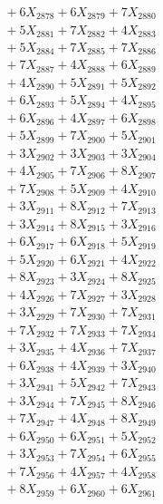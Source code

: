 \documentclass[a4paper,10pt]{article}
\begin{document}
{\begin{align}
&\;  + 6 X_{2878} + 6 X_{2879} + 7 X_{2880} \\[0.3ex]
&\;  + 5 X_{2881} + 7 X_{2882} + 4 X_{2883} \\[0.3ex]
&\;  + 5 X_{2884} + 7 X_{2885} + 7 X_{2886} \\[0.3ex]
&\;  + 7 X_{2887} + 4 X_{2888} + 6 X_{2889} \\[0.5ex]\allowbreak
&\;  + 4 X_{2890} + 5 X_{2891} + 5 X_{2892} \\[0.3ex]
&\;  + 6 X_{2893} + 5 X_{2894} + 4 X_{2895} \\[0.3ex]
&\;  + 6 X_{2896} + 4 X_{2897} + 6 X_{2898} \\[0.3ex]
&\;  + 5 X_{2899} + 7 X_{2900} + 5 X_{2901} \\[0.3ex]
&\;  + 3 X_{2902} + 3 X_{2903} + 3 X_{2904} \\[0.3ex]
&\;  + 4 X_{2905} + 7 X_{2906} + 8 X_{2907} \\[0.3ex]
&\;  + 7 X_{2908} + 5 X_{2909} + 4 X_{2910} \\[0.3ex]
&\;  + 3 X_{2911} + 8 X_{2912} + 7 X_{2913} \\[0.3ex]
&\;  + 3 X_{2914} + 8 X_{2915} + 3 X_{2916} \\[0.3ex]
&\;  + 6 X_{2917} + 6 X_{2918} + 5 X_{2919} \\[0.5ex]\allowbreak
&\;  + 5 X_{2920} + 6 X_{2921} + 4 X_{2922} \\[0.3ex]
&\;  + 8 X_{2923} + 3 X_{2924} + 8 X_{2925} \\[0.3ex]
&\;  + 4 X_{2926} + 7 X_{2927} + 3 X_{2928} \\[0.3ex]
&\;  + 3 X_{2929} + 7 X_{2930} + 7 X_{2931} \\[0.3ex]
&\;  + 7 X_{2932} + 7 X_{2933} + 7 X_{2934} \\[0.3ex]
&\;  + 3 X_{2935} + 4 X_{2936} + 7 X_{2937} \\[0.3ex]
&\;  + 6 X_{2938} + 4 X_{2939} + 3 X_{2940} \\[0.3ex]
&\;  + 3 X_{2941} + 5 X_{2942} + 7 X_{2943} \\[0.3ex]
&\;  + 3 X_{2944} + 7 X_{2945} + 8 X_{2946} \\[0.3ex]
&\;  + 7 X_{2947} + 4 X_{2948} + 8 X_{2949} \\[0.5ex]\allowbreak
&\;  + 6 X_{2950} + 6 X_{2951} + 5 X_{2952} \\[0.3ex]
&\;  + 3 X_{2953} + 7 X_{2954} + 6 X_{2955} \\[0.3ex]
&\;  + 7 X_{2956} + 4 X_{2957} + 4 X_{2958} \\[0.3ex]
&\;  + 8 X_{2959} + 6 X_{2960} + 6 X_{2961} \\[0.3ex]

\end{align}}
\end{document}
